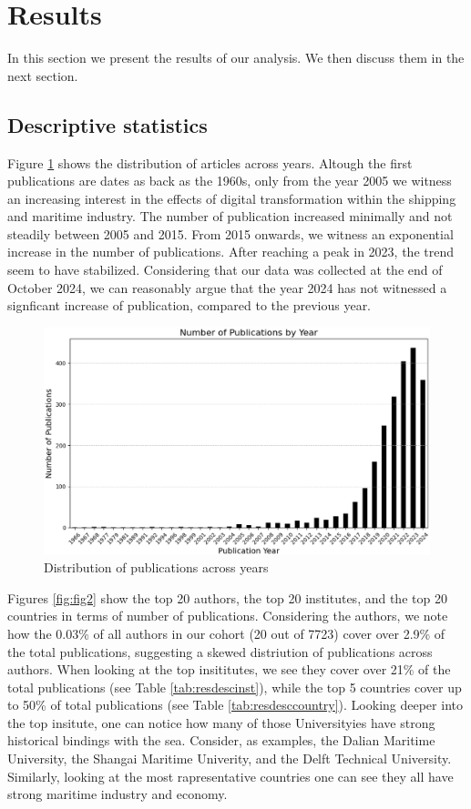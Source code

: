 \documentclass[a4paper, review, endfloat, authoryear]{elsarticle}
\begin{document}
	\section{Results}
	In this section we present the results of our analysis. We then discuss them in the next section.
	
	\subsection{Descriptive statistics}
	Figure \ref{fig:fig1} shows the distribution of articles across years. Altough the first publications are dates as back as the 1960s, only from the year 2005 we witness an increasing interest in the effects of digital transformation within the shipping and maritime industry. The number of publication increased minimally and not steadily between 2005 and 2015. From 2015 onwards, we witness an exponential increase in the number of publications. After reaching a peak in 2023, the trend seem to have stabilized. Considering that our data was collected at the end of October 2024, we can reasonably argue that the year 2024 has not witnessed a signficant increase of publication, compared to the previous year.
	
	\begin{figure}[htbp]
		\centering
		\includegraphics[width=\linewidth]{pics/no_publications_year.eps}
		\caption{Distribution of publications across years}\label{fig:fig1}
	\end{figure}
	
	Figures \ref{fig:fig2} show the top 20 authors, the top 20 institutes, and the top 20 countries in terms of number of publications. Considering the authors, we note how the 0.03\% of all authors in our cohort (20 out of 7723) cover over 2.9\% of the total publications, suggesting a skewed distriution of publications across authors. When looking at the top insititutes, we see they cover over 21\% of the total publications (see Table \ref{tab:resdescinst}), while the top 5 countries cover up to 50\% of total publications (see Table \ref{tab:resdesccountry}). Looking deeper into the top insitute, one can notice how many of those Universityies have strong historical bindings with the sea. Consider, as examples, the Dalian Maritime University, the Shangai Maritime Univerity, and the Delft Technical University. Similarly, looking at the most rapresentative countries one can see they all have strong maritime industry and economy.
	
\end{document}
